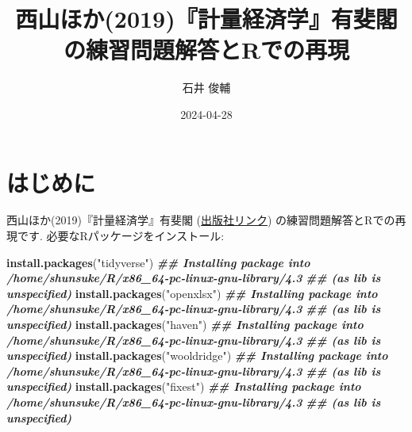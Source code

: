 \documentclass[
]{book}
\title{西山ほか(2019)『計量経済学』有斐閣の練習問題解答とRでの再現}
\author{石井 俊輔}
\date{2024-04-28}
\newenvironment{Shaded}{\begin{snugshade}}{\end{snugshade}}
\newcommand{\DocumentationTok}[1]{\textcolor[rgb]{0.56,0.35,0.01}{\textbf{\textit{#1}}}}
\newcommand{\FunctionTok}[1]{\textcolor[rgb]{0.13,0.29,0.53}{\textbf{#1}}}
\newcommand{\NormalTok}[1]{#1}
\newcommand{\StringTok}[1]{\textcolor[rgb]{0.31,0.60,0.02}{#1}}
\begin{document}
\maketitle

{
\setcounter{tocdepth}{1}
\tableofcontents
}
\hypertarget{ux306fux3058ux3081ux306b}{%
\chapter*{はじめに}\label{ux306fux3058ux3081ux306b}}

西山ほか(2019)『計量経済学』有斐閣 (\href{https://www.yuhikaku.co.jp/books/detail/9784641053854}{出版社リンク}) の練習問題解答とRでの再現です.
必要なRパッケージをインストール:

\begin{Shaded}
\begin{Highlighting}[]
\FunctionTok{install.packages}\NormalTok{(}\StringTok{"tidyverse"}\NormalTok{)}
\DocumentationTok{\#\# Installing package into \textquotesingle{}/home/shunsuke/R/x86\_64{-}pc{-}linux{-}gnu{-}library/4.3\textquotesingle{}}
\DocumentationTok{\#\# (as \textquotesingle{}lib\textquotesingle{} is unspecified)}
\FunctionTok{install.packages}\NormalTok{(}\StringTok{"openxlsx"}\NormalTok{)}
\DocumentationTok{\#\# Installing package into \textquotesingle{}/home/shunsuke/R/x86\_64{-}pc{-}linux{-}gnu{-}library/4.3\textquotesingle{}}
\DocumentationTok{\#\# (as \textquotesingle{}lib\textquotesingle{} is unspecified)}
\FunctionTok{install.packages}\NormalTok{(}\StringTok{"haven"}\NormalTok{)}
\DocumentationTok{\#\# Installing package into \textquotesingle{}/home/shunsuke/R/x86\_64{-}pc{-}linux{-}gnu{-}library/4.3\textquotesingle{}}
\DocumentationTok{\#\# (as \textquotesingle{}lib\textquotesingle{} is unspecified)}
\FunctionTok{install.packages}\NormalTok{(}\StringTok{"wooldridge"}\NormalTok{)}
\DocumentationTok{\#\# Installing package into \textquotesingle{}/home/shunsuke/R/x86\_64{-}pc{-}linux{-}gnu{-}library/4.3\textquotesingle{}}
\DocumentationTok{\#\# (as \textquotesingle{}lib\textquotesingle{} is unspecified)}
\FunctionTok{install.packages}\NormalTok{(}\StringTok{"fixest"}\NormalTok{)}
\DocumentationTok{\#\# Installing package into \textquotesingle{}/home/shunsuke/R/x86\_64{-}pc{-}linux{-}gnu{-}library/4.3\textquotesingle{}}
\DocumentationTok{\#\# (as \textquotesingle{}lib\textquotesingle{} is unspecified)}
\end{Highlighting}
\end{Shaded}
\end{document}
